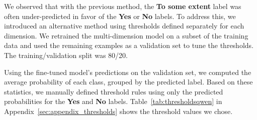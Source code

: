 \documentclass[11pt]{article}
\begin{document}
We observed that with the previous method, the \textbf{To some extent} label was often under-predicted in favor of the \textbf{Yes} or \textbf{No} labels.
To address this, we introduced an alternative method using thresholds defined separately for each dimension.
We retrained the multi-dimension model on a subset of the training data and used the remaining examples as a validation set to tune the thresholds.
The training/validation split was 80/20.

Using the fine-tuned model’s predictions on the validation set, we computed the average probability of each class, grouped by the predicted label.
Based on these statistics, we manually defined threshold rules using only the predicted probabilities for the \textbf{Yes} and \textbf{No} labels.
Table~\ref{tab:thresholdsqwen} in Appendix~\ref{sec:appendix_thresholds} shows the threshold values we chose.




\end{document}
